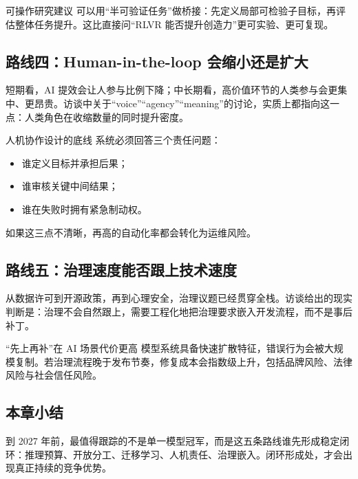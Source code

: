 \begin{knowledgebox}{可操作研究建议}
可以用“半可验证任务”做桥接：先定义局部可检验子目标，再评估整体任务提升。这比直接问“RLVR 能否提升创造力”更可实验、更可复现。
\end{knowledgebox}

\subsection{路线四：Human-in-the-loop 会缩小还是扩大}

短期看，AI 提效会让人参与比例下降；中长期看，高价值环节的人类参与会更集中、更昂贵。访谈中关于“voice”“agency”“meaning”的讨论，实质上都指向这一点：人类角色在收缩数量的同时提升密度。

\begin{importantbox}{人机协作设计的底线}
系统必须回答三个责任问题：
\begin{itemize}[leftmargin=1.5em]
    \item 谁定义目标并承担后果；
    \item 谁审核关键中间结果；
    \item 谁在失败时拥有紧急制动权。
\end{itemize}
如果这三点不清晰，再高的自动化率都会转化为运维风险。
\end{importantbox}

\subsection{路线五：治理速度能否跟上技术速度}

从数据许可到开源政策，再到心理安全，治理议题已经贯穿全栈。访谈给出的现实判断是：治理不会自然跟上，需要工程化地把治理要求嵌入开发流程，而不是事后补丁。

\begin{warningbox}{“先上再补”在 AI 场景代价更高}
模型系统具备快速扩散特征，错误行为会被大规模复制。若治理流程晚于发布节奏，修复成本会指数级上升，包括品牌风险、法律风险与社会信任风险。
\end{warningbox}

\subsection{本章小结}

到 2027 年前，最值得跟踪的不是单一模型冠军，而是这五条路线谁先形成稳定闭环：推理预算、开放分工、迁移学习、人机责任、治理嵌入。闭环形成处，才会出现真正持续的竞争优势。

